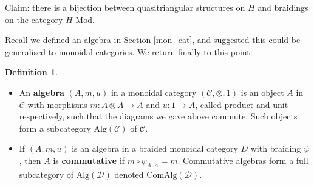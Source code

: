 \documentclass[11pt]{article}
\newcommand{\bb}{\medbreak}
\newcommand{\nt}{\noindent}
\newcommand{\rt}{\xrightarrow{}}
\newcommand{\Mod}{\text{Mod}}
\newcommand{\define}[1]{\textbf{#1}}
\theoremstyle{definition}
\newtheorem{definition}[lemma]{Definition}
\begin{document}
\nt Claim: there is a bijection between quasitriangular structures on $H$ and braidings on the category $H$-$\Mod$.\bb

\nt Recall we defined an algebra in Section \ref{mon_cat}, and suggested this could be generalised to monoidal categories. We return finally to this point:
\begin{definition}\label{algebra} \begin{itemize}
  \item An \define{algebra} $(A,m,u)$ in a monoidal category $(\mathcal{C},\otimes,1)$ is an object $A$ in $\mathcal{C}$ with morphisms $m:A\otimes A\rt A$ and $u:1\rt A$, called product and unit respectively, such that the diagrams we gave above commute. Such objects form a subcategory $\text{Alg}(\mathcal{C})$ of $\mathcal{C}$.

  \item If $(A,m,u)$ is an algebra in a braided monoidal category $D$ with braiding $\psi$, then $A$ is \define{commutative} if $m\circ \psi_{A,A}=m$. Commutative algebras form a full subcategory of $\text{Alg}(\mathcal{D})$ denoted $\text{ComAlg}(\mathcal{D})$.
\end{itemize}
\end{definition}









\newpage


 
\end{document}

